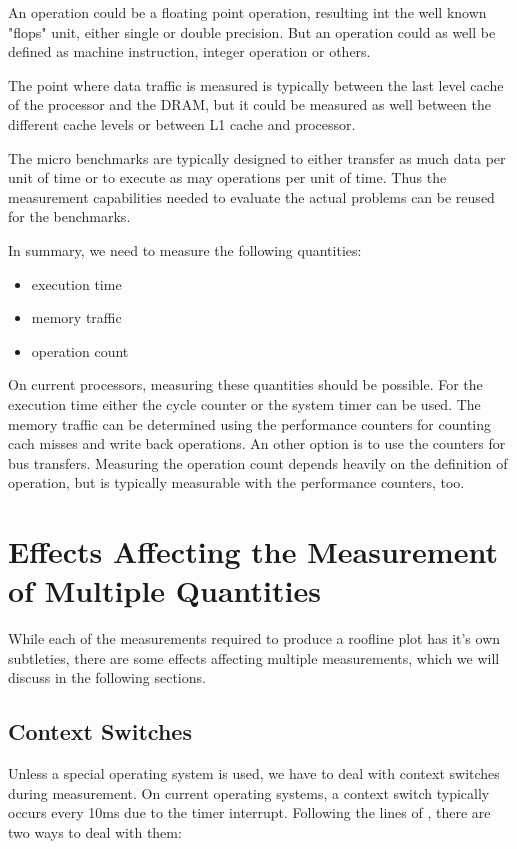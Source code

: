 \documentclass[a4paper,12pt]{article}
\begin{document}
An operation could be a floating point operation, resulting int the well known
"flops" unit, either single or double precision. But an operation could as well
be defined as machine instruction, integer operation or others.

The point where data traffic is measured is typically between the last level
cache of the processor and the DRAM, but it could be measured as well between
the different cache levels or between L1 cache and processor.

The micro benchmarks are typically designed to either transfer as much data per
unit of time or to execute as may operations per unit of time. Thus the
measurement capabilities needed to evaluate the actual problems can be reused
for the benchmarks. 

In summary, we need to measure the following quantities:
\begin{itemize}
\item execution time
\item memory traffic
\item operation count
\end{itemize}

On current processors, measuring these quantities should be possible. For the
execution time either the cycle counter or the system timer can be used. The
memory traffic can be determined using the performance counters for counting
cach misses and write back operations. An other option is to use the counters
for bus transfers. Measuring the operation count depends heavily on the
definition of operation, but is typically measurable with the performance
counters, too.

\section{Effects Affecting the Measurement of Multiple Quantities}
While each of the measurements required to produce a roofline plot has it's own
subtleties, there are some effects affecting multiple measurements, which we
will discuss in the following sections.

\subsection{Context Switches}
Unless a special operating system is used, we have to deal with context switches
during measurement. On current operating systems, a context switch typically
occurs every 10ms due to the timer interrupt. Following the lines of
\cite{ComSysProgPersp}, there are two ways to deal with them:
\end{document}
